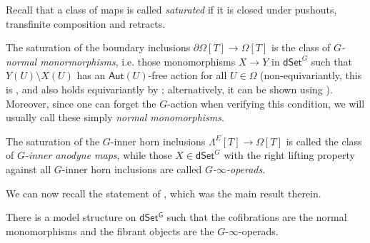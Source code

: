 \documentclass[a4paper,10pt
 ,draft
]{article}%
\begin{document}



Recall that a class of maps is called \textit{saturated} if it is closed under pushouts, transfinite composition and retracts. 


The saturation of the boundary inclusions 
$\partial \Omega[T] \to \Omega[T]$
is the class of \textit{$G$-normal monormorphisms},
i.e. those monomorphisms $X \to Y$ in $\mathsf{dSet}^G$ such that
$Y(U) \setminus X(U)$ has an $\mathsf{Aut}(U)$-free action for all $U \in \Omega$ (non-equivariantly, this is \cite[Prop. 1.5]{CM11}, and also holds equivariantly by \cite[Rem. 6.7]{Per18}; alternatively, it can be shown using \cite[Props. 6.5(ii) and 5.62]{Per18}).
Moreover, since one can forget the $G$-action when verifying this condition, we will usually call these simply \textit{normal monomorphisms}. 


The saturation of the $G$-inner horn inclusions 
$\Lambda^E[T] \to \Omega[T]$
is called the class of \textit{$G$-inner anodyne maps}, 
while those $X \in \mathsf{dSet}^G$
with the right lifting property against all $G$-inner horn inclusions are called \textit{$G$-$\infty$-operads}.

We can now recall the statement of \cite[Thm 2.1]{Per18}, which was the main result therein.

\begin{theorem}
	There is a model structure on $\mathsf{dSet^G}$
	such that the cofibrations are the normal monomorphisms and the fibrant objects are the $G$-$\infty$-operads.
\end{theorem}
\end{document}

